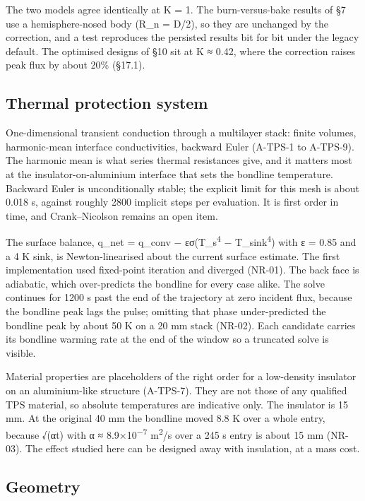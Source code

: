 \documentclass[
  a4paper,
  11pt]{article}
\begin{document}
The two models agree identically at K = 1. The burn-versus-bake results
of §7 use a hemisphere-nosed body (R\_n = D/2), so they are unchanged by
the correction, and a test reproduces the persisted results bit for bit
under the legacy default. The optimised designs of §10 sit at K ≈ 0.42,
where the correction raises peak flux by about 20\% (§17.1).

\subsection{Thermal protection system}

One-dimensional transient conduction through a multilayer stack: finite
volumes, harmonic-mean interface conductivities, backward Euler (A-TPS-1
to A-TPS-9). The harmonic mean is what series thermal resistances give,
and it matters most at the insulator-on-aluminium interface that sets
the bondline temperature. Backward Euler is unconditionally stable; the
explicit limit for this mesh is about 0.018 s, against roughly 2800
implicit steps per evaluation. It is first order in time, and
Crank--Nicolson remains an open item.

The surface balance, q\_net = q\_conv − εσ(T\_s\textsuperscript{4} −
T\_sink\textsuperscript{4}) with ε = 0.85 and a 4 K sink, is
Newton-linearised about the current surface estimate. The first
implementation used fixed-point iteration and diverged (NR-01). The back
face is adiabatic, which over-predicts the bondline for every case
alike. The solve continues for 1200 s past the end of the trajectory at
zero incident flux, because the bondline peak lags the pulse; omitting
that phase under-predicted the bondline peak by about 50 K on a 20 mm
stack (NR-02). Each candidate carries its bondline warming rate at the
end of the window so a truncated solve is visible.

Material properties are placeholders of the right order for a
low-density insulator on an aluminium-like structure (A-TPS-7). They are
not those of any qualified TPS material, so absolute temperatures are
indicative only. The insulator is 15 mm. At the original 40 mm the
bondline moved 8.8 K over a whole entry, because √(αt) with α ≈
8.9×10\textsuperscript{−7} m\textsuperscript{2}/s over a 245 s entry is
about 15 mm (NR-03). The effect studied here can be designed away with
insulation, at a mass cost.

\subsection{Geometry}
\end{document}
